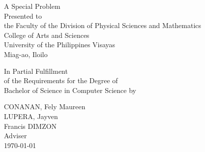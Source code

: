 \begin{titlepage}
\centering


\vspace{0.875cm}
A Special Problem\\
Presented to\\
the Faculty of the Division of Physical Sciences and Mathematics\\
College of Arts and Sciences\\
University of the Philippines Visayas\\
Miag-ao, Iloilo

\vspace{0.875cm}
In Partial Fulfillment\\
of the Requirements for the Degree of\\
Bachelor of Science in Computer Science
\vspace{1.75cm}
by\

\vspace{0cm}
CONANAN, Fely Maureen  \\
LUPERA, Jayven  \\

\vspace{1.75cm}
Francis DIMZON \\
Adviser\\

\vspace{1cm}
\today
\end{titlepage}
